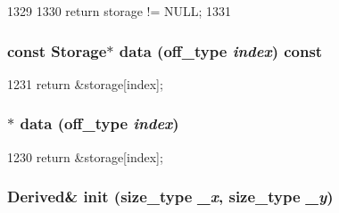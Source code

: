 \begin{DoxyCode}
1329     {
1330         return storage != NULL;
1331     }
\end{DoxyCode}
\hypertarget{classStats_1_1Vector2dBase_a53a38df6a99d518a4016d9635235cc44}{
\subsubsection[{data}]{\setlength{\rightskip}{0pt plus 5cm}const {\bf Storage}$\ast$ data ({\bf off\_\-type} {\em index}) const}}
\label{classStats_1_1Vector2dBase_a53a38df6a99d518a4016d9635235cc44}



\begin{DoxyCode}
1231 { return &storage[index]; }
\end{DoxyCode}
\hypertarget{classStats_1_1Vector2dBase_ad9077db0c8f34051d2e7766c947aa7b2}{
\subsubsection[{data}]{$\ast$ data ({\bf off\_\-type} {\em index})}}
\label{classStats_1_1Vector2dBase_ad9077db0c8f34051d2e7766c947aa7b2}



\begin{DoxyCode}
1230 { return &storage[index]; }
\end{DoxyCode}
\hypertarget{classStats_1_1Vector2dBase_ab9a02aa81f6a70a71d2dc2c155acbcac}{
\subsubsection[{init}]{\setlength{\rightskip}{0pt plus 5cm}Derived\& init ({\bf size\_\-type} {\em \_\-x}, \/  {\bf size\_\-type} {\em \_\-y})}}
\label{classStats_1_1Vector2dBase_ab9a02aa81f6a70a71d2dc2c155acbcac}



